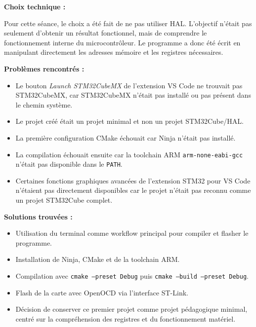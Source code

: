 \documentclass[11pt,a4paper]{article}
\begin{document}
\begin{sessionbox}
		\vspace{0.3cm}
		
		\textbf{Choix technique :}
		
		Pour cette séance, le choix a été fait de ne pas utiliser HAL. L'objectif n'était pas seulement d'obtenir un résultat fonctionnel, mais de comprendre le fonctionnement interne du microcontrôleur. Le programme a donc été écrit en manipulant directement les adresses mémoire et les registres nécessaires.
		
		\vspace{0.3cm}
		
		\textbf{Problèmes rencontrés :}
		
		\begin{itemize}
			\item Le bouton \textit{Launch STM32CubeMX} de l'extension VS Code ne trouvait pas STM32CubeMX, car STM32CubeMX n'était pas installé ou pas présent dans le chemin système.
			\item Le projet créé était un projet minimal et non un projet STM32Cube/HAL.
			\item La première configuration CMake échouait car Ninja n'était pas installé.
			\item La compilation échouait ensuite car la toolchain ARM \texttt{arm-none-eabi-gcc} n'était pas disponible dans le \texttt{PATH}.
			\item Certaines fonctions graphiques avancées de l'extension STM32 pour VS Code n'étaient pas directement disponibles car le projet n'était pas reconnu comme un projet STM32Cube complet.
		\end{itemize}
		
		\vspace{0.3cm}
		
		\textbf{Solutions trouvées :}
		
		\begin{itemize}
			\item Utilisation du terminal comme workflow principal pour compiler et flasher le programme.
			\item Installation de Ninja, CMake et de la toolchain ARM.
			\item Compilation avec \texttt{cmake --preset Debug} puis \texttt{cmake --build --preset Debug}.
			\item Flash de la carte avec OpenOCD via l'interface ST-Link.
			\item Décision de conserver ce premier projet comme projet pédagogique minimal, centré sur la compréhension des registres et du fonctionnement matériel.
		\end{itemize}
		

\end{sessionbox}
\end{document}
